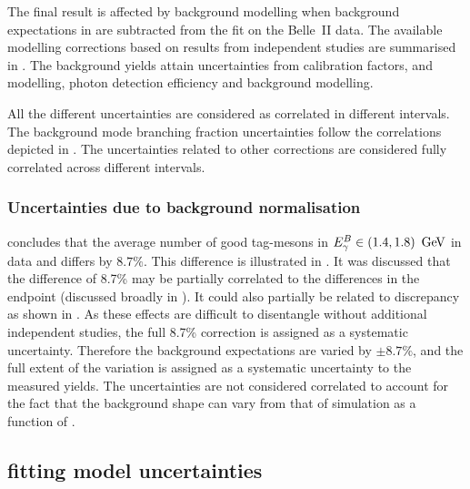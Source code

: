 The final result is affected by background modelling when background expectations in \MC are subtracted from the \Mbc fit on the Belle~II data.
The available modelling corrections based on results from independent studies are summarised in .
The background yields attain uncertainties from \FEI calibration factors, \piVeto and \etaVeto modelling, photon detection efficiency and background modelling. 

All the different uncertainties are considered as correlated in different \EB intervals.
The background mode branching fraction uncertainties follow the correlations depicted in .
The uncertainties related to other corrections are considered fully correlated across different \EB intervals.

\subsubsection{Uncertainties due to background normalisation}\label{sec:background_normalisation_systematic}

 concludes that the average number of 
good tag-\B mesons in ${E^B_{\gamma}}\in(1.4,1.8)~\mathrm{\,Ge\kern -0.1em V}$ in data and \MC differs by $8.7\%$.
This difference is illustrated in .
It was discussed that the difference of 8.7\% may be partially correlated to the differences in the \Mbc endpoint (discussed broadly in ).
It could also partially be related to \ZMVA discrepancy as shown in .
As these effects are difficult to disentangle without additional independent studies, the full 8.7\% correction is assigned as a systematic uncertainty.
Therefore the background expectations are varied by $\pm 8.7\%$, and the full extent of the variation is assigned as a systematic uncertainty to the measured \BtoXsgamma yields.
The uncertainties are not considered correlated to account for the fact that the background shape can vary from that of simulation as a function of \EB.



\subsection{\texorpdfstring{\Mbc}{Mbc} fitting model uncertainties}\label{sec:fit_uncertainties}

